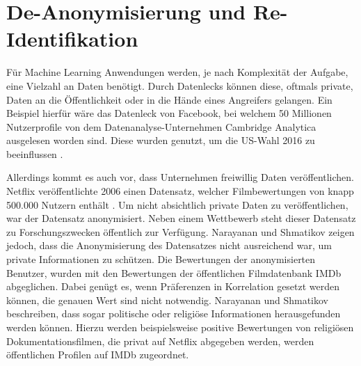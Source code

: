 \section{De-Anonymisierung und Re-Identifikation}\label{sec:deano}

Für Machine Learning Anwendungen werden, je nach Komplexität der Aufgabe, eine Vielzahl an Daten benötigt.
Durch Datenlecks können diese, oftmals private, Daten an die Öffentlichkeit oder in die Hände eines Angreifers gelangen.
Ein Beispiel hierfür wäre das Datenleck von Facebook, bei welchem 50 Millionen Nutzerprofile von dem Datenanalyse-Unternehmen Cambridge Analytica ausgelesen worden sind. 
Diese wurden genutzt, um die US-Wahl 2016 zu beeinflussen \cite{I-2}.

Allerdings kommt es auch vor, dass Unternehmen freiwillig Daten veröffentlichen. 
Netflix veröffentlichte 2006 einen Datensatz, welcher Filmbewertungen von knapp 500.000 Nutzern enthält \cite{I-3}. 
Um nicht absichtlich private Daten zu veröffentlichen, war der Datensatz anonymisiert.
Neben einem Wettbewerb steht dieser Datensatz zu Forschungszwecken öffentlich zur Verfügung.
Narayanan und Shmatikov \cite{P-29} zeigen jedoch, dass die Anonymisierung des Datensatzes nicht ausreichend war, um private Informationen zu schützen.
Die Bewertungen der anonymisierten Benutzer, wurden mit den Bewertungen der öffentlichen Filmdatenbank IMDb abgeglichen.
Dabei genügt es, wenn Präferenzen in Korrelation gesetzt werden können, die genauen Wert sind nicht notwendig.
Narayanan und Shmatikov \cite{P-29} beschreiben, dass sogar politische oder religiöse Informationen herausgefunden werden können.
Hierzu werden beispielsweise positive Bewertungen von religiösen Dokumentationsfilmen, die privat auf Netflix abgegeben werden, werden öffentlichen Profilen auf IMDb zugeordnet.
